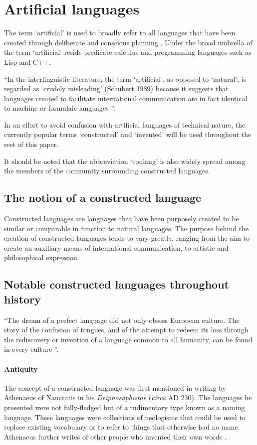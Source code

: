 \documentclass[14pt, a4paper]{extreport}
\begin{document}
  \section{Artificial languages}
The term `artificial' is used to broadly refer to all languages that have been created through deliberate and conscious planning \parencite[41]{stria}. Under the broad umbrella of the term `artificial' reside predicate calculus and programming languages such as Lisp and C++.

``In the interlinguistic literature, the term `artificial', as opposed to `natural', is regarded as `crudely misleading' (Schubert 1989) because it suggests that languages created to facilitate international communication are in fact identical to machine or formulaic languages \parencite[45]{stria}''.

In an effort to avoid confusion with artificial languages of technical nature, the currently popular terms `constructed' and `invented' will be used throughout the rest of this paper.

It should be noted that the abbreviation `conlang' is also widely spread among the members of the community surrounding constructed languages.
\subsection{The notion of a constructed language}
Constructed languages are languages that have been purposely created to be similar or comparable in function to natural languages. The purpose behind the creation of constructed languages tends to vary greatly, ranging from the aim to create an auxiliary means of international communication, to artistic and philosophical expression.
    \subsection{Notable constructed languages throughout history}
``The dream of a perfect language did not only obsess European culture. The story of the confusion of tongues, and of the attempt to redeem its loss through the rediscovery or invention of a language common to all humanity, can be found in every culture \parencite[1]{eco}''.
        \paragraph{Antiquity}
The concept of a constructed language was first mentioned in writing by Athenaeus of Naucratis in his \textit{Deipnosophistae} (\textit{circa} \textsc{AD} 230). The languages he presented were not fully-fledged but of a rudimentary type known as a naming language. These languages were collections of neologisms that could be used to replace existing vocabulary or to refer to things that otherwise had no name. Athenaeus further writes of other people who invented their own words \parencite{sanders}.
\end{document}
